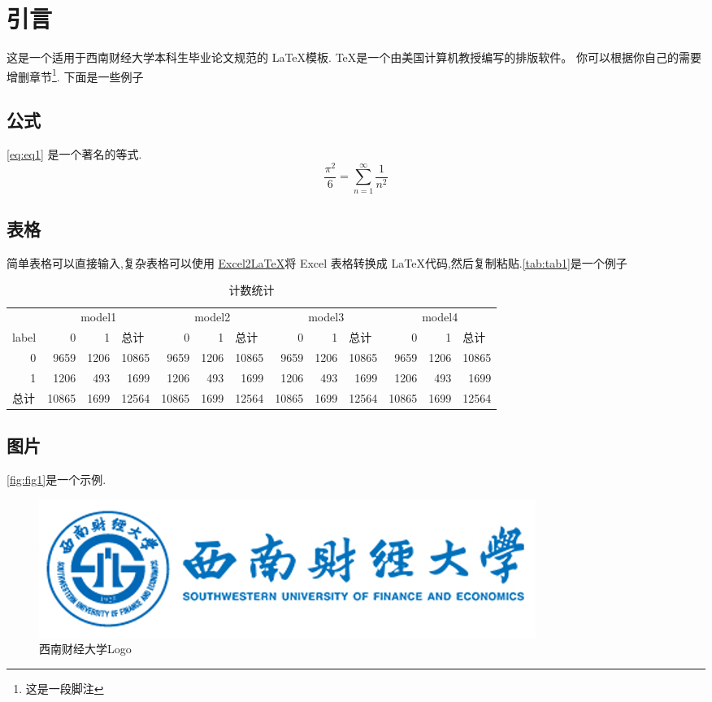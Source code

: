 \section{引言}
这是一个适用于西南财经大学本科生毕业论文规范的 \LaTeX \cite{lamport1994latex,goossens1994latex}模板.
\TeX 是一个由美国计算机教授\citet{knuth1984texbook}编写的排版软件。
你可以根据你自己的需要增删章节\footnote{这是一段脚注}. 下面是一些例子

\subsection{公式}
\autoref{eq:eq1} 是一个著名的等式.
\begin{equation}\label{eq:eq1}
    \frac{\pi^2}{6}=\sum_{n=1}^{\infty}\frac{1}{n^2}
\end{equation}
\subsection{表格}
简单表格可以直接输入,复杂表格可以使用 \href{https://github.com/krlmlr/Excel2LaTeX}{Excel2LaTeX}将 Excel 表格转换成 \LaTeX 代码,然后复制粘贴.\autoref{tab:tab1}是一个例子
\begin{table}[htbp]
    \centering
    \small
    \caption{计数统计}
      \begin{tabular}{|l|rrr|rrr|rrr|rrr|}
      \hline
        & \multicolumn{3}{c|}{model1} & \multicolumn{3}{c|}{model2} & \multicolumn{3}{c|}{model3} & \multicolumn{3}{c|}{model4} \bigstrut\\
  \cline{2-13}    label & 0 & 1 & \multicolumn{1}{l|}{总计} & 0 & 1 & \multicolumn{1}{l|}{总计} & 0 & 1 & \multicolumn{1}{l|}{总计} & 0 & 1 & \multicolumn{1}{l|}{总计} \bigstrut\\
      \hline
      \multicolumn{1}{|r|}{0} & 9659 & 1206 & 10865 & 9659 & 1206 & 10865 & 9659 & 1206 & 10865 & 9659 & 1206 & 10865 \bigstrut[t]\\
      \multicolumn{1}{|r|}{1} & 1206 & 493 & 1699 & 1206 & 493 & 1699 & 1206 & 493 & 1699 & 1206 & 493 & 1699 \\
      总计 & 10865 & 1699 & 12564 & 10865 & 1699 & 12564 & 10865 & 1699 & 12564 & 10865 & 1699 & 12564 \bigstrut[b]\\
      \hline
      \end{tabular}%
    \label{tab:tab1}%
  \end{table}%
  
  \subsection{图片}
  \autoref{fig:fig1}是一个示例.

  \begin{figure}[htbp]
      \centering
      \includegraphics{swufe-Logo/opaque.png}
      \caption{西南财经大学Logo}
      \label{fig:fig1}
  \end{figure}